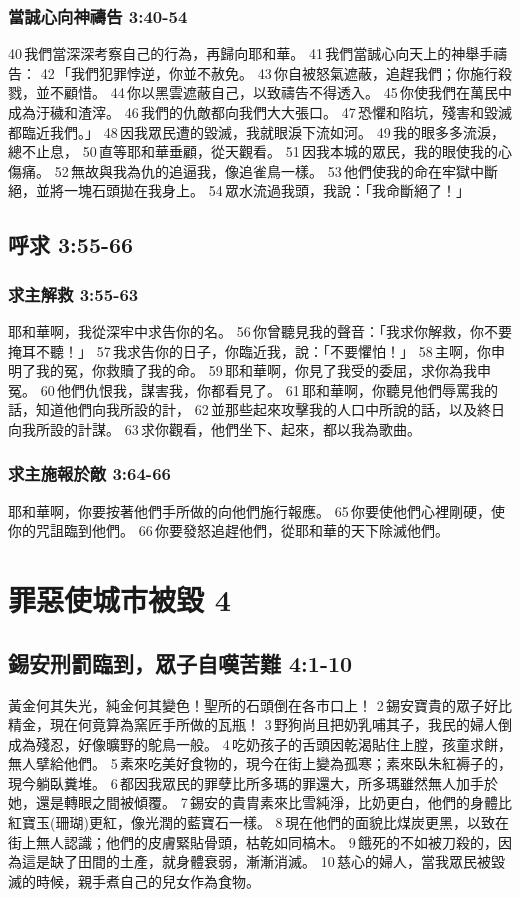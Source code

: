 \subsubsection{當誠心向神禱告 3:40-54}
40 我們當深深考察自己的行為，再歸向耶和華。 41 我們當誠心向天上的神舉手禱告： 42 「我們犯罪悖逆，你並不赦免。 43 你自被怒氣遮蔽，追趕我們；你施行殺戮，並不顧惜。 44 你以黑雲遮蔽自己，以致禱告不得透入。 45 你使我們在萬民中成為汙穢和渣滓。 46 我們的仇敵都向我們大大張口。 47 恐懼和陷坑，殘害和毀滅都臨近我們。」 48 因我眾民遭的毀滅，我就眼淚下流如河。 49 我的眼多多流淚，總不止息， 50 直等耶和華垂顧，從天觀看。 51 因我本城的眾民，我的眼使我的心傷痛。 52 無故與我為仇的追逼我，像追雀鳥一樣。 53 他們使我的命在牢獄中斷絕，並將一塊石頭拋在我身上。 54 眾水流過我頭，我說：「我命斷絕了！」

\subsection{呼求 3:55-66}
\subsubsection{求主解救 3:55-63}
耶和華啊，我從深牢中求告你的名。 56 你曾聽見我的聲音：「我求你解救，你不要掩耳不聽！」 57 我求告你的日子，你臨近我，說：「不要懼怕！」 58 主啊，你申明了我的冤，你救贖了我的命。 59 耶和華啊，你見了我受的委屈，求你為我申冤。 60 他們仇恨我，謀害我，你都看見了。 61 耶和華啊，你聽見他們辱罵我的話，知道他們向我所設的計， 62 並那些起來攻擊我的人口中所說的話，以及終日向我所設的計謀。 63 求你觀看，他們坐下、起來，都以我為歌曲。

\subsubsection{求主施報於敵 3:64-66}
耶和華啊，你要按著他們手所做的向他們施行報應。 65 你要使他們心裡剛硬，使你的咒詛臨到他們。 66 你要發怒追趕他們，從耶和華的天下除滅他們。

\section{罪惡使城市被毀 4}
\subsection{錫安刑罰臨到，眾子自嘆苦難 4:1-10}
黃金何其失光，純金何其變色！聖所的石頭倒在各市口上！ 2 錫安寶貴的眾子好比精金，現在何竟算為窯匠手所做的瓦瓶！ 3 野狗尚且把奶乳哺其子，我民的婦人倒成為殘忍，好像曠野的鴕鳥一般。 4 吃奶孩子的舌頭因乾渴貼住上膛，孩童求餅，無人擘給他們。 5 素來吃美好食物的，現今在街上變為孤寒；素來臥朱紅褥子的，現今躺臥糞堆。 6 都因我眾民的罪孽比所多瑪的罪還大，所多瑪雖然無人加手於她，還是轉眼之間被傾覆。 7 錫安的貴胄素來比雪純淨，比奶更白，他們的身體比紅寶玉(珊瑚)更紅，像光潤的藍寶石一樣。 8 現在他們的面貌比煤炭更黑，以致在街上無人認識；他們的皮膚緊貼骨頭，枯乾如同槁木。 9 餓死的不如被刀殺的，因為這是缺了田間的土產，就身體衰弱，漸漸消滅。 10 慈心的婦人，當我眾民被毀滅的時候，親手煮自己的兒女作為食物。

